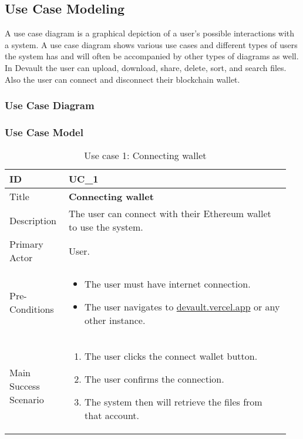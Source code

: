 
\subsection{Use Case Modeling}

A use case diagram is a graphical depiction of a user's possible interactions with a system. A use case diagram shows various use cases and different types of users the system has and will often be accompanied by other types of diagrams as well.
In Devault the user can upload, download, share, delete, sort, and search files. Also the user can connect and disconnect their blockchain wallet.

\subsubsection{Use Case Diagram}



\newpage

\subsubsection{Use Case Model}

\begin{longtable}{p{0.20\linewidth} | p{0.75\linewidth}}
  \caption{Use case 1: Connecting wallet}
  \label{tab:useCaseConnect}
  \\\toprule
  ID & UC\_1
  \\\midrule
  Title & \textbf{Connecting wallet}
  \\\hline
  Description & The user can connect with their Ethereum wallet to use the system.
  \\\hline
  Primary Actor & User.
  \\\hline
  Pre-Conditions & {
    \begin{itemize}
    \item The user must have internet connection.
    \item The user navigates to \url{devault.vercel.app} or any other instance.
    \end{itemize}
  }\vspace*{-\baselineskip}
  \\\hline
  Main Success Scenario & {
    \begin{enumerate}
    \item The user clicks the connect wallet button.
    \item The user confirms the connection.
    \item The system then will retrieve the files from that account.
    \end{enumerate}
  }\vspace*{-\baselineskip}
  \\\bottomrule
\end{longtable}

